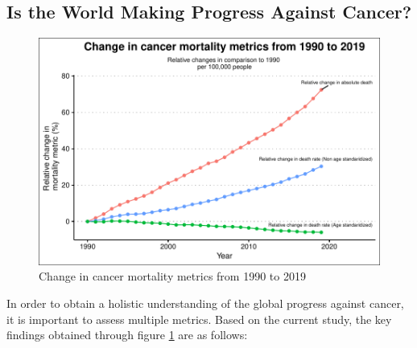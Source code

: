 \documentclass[11pt,a4paper,]{article}
\begin{document}
\hypertarget{is-the-world-making-progress-against-cancer-1}{%
\subsection{\texorpdfstring{Is the World Making Progress Against Cancer? \label{section:improve}}{Is the World Making Progress Against Cancer? }}\label{is-the-world-making-progress-against-cancer-1}}

\begin{figure}

{\centering \includegraphics{etc5513_assignment2_g1_t1_files/figure-latex/lineplot-1} 

}

\caption{Change in cancer mortality metrics from 1990 to 2019}\label{fig:lineplot}
\end{figure}

In order to obtain a holistic understanding of the global progress against cancer, it is important to assess multiple metrics. Based on the current study, the key findings obtained through figure \ref{fig:lineplot} are as follows:
\end{document}

